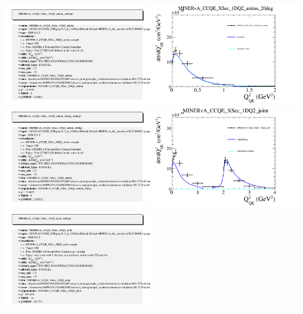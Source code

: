 \documentclass{article}
\begin{document}
\includegraphics[width=0.49\textwidth]{figures/nuisance_MINERvA_CCQE_XSec_1DQ2_antinu_info.png}
\centering
\includegraphics[width=0.49\textwidth]{figures/nuisance_MINERvA_CCQE_XSec_1DQ2_antinu_20deg_comp.png}
\includegraphics[width=0.49\textwidth]{figures/nuisance_MINERvA_CCQE_XSec_1DQ2_antinu_20deg_info.png}
\centering
\includegraphics[width=0.49\textwidth]{figures/nuisance_MINERvA_CCQE_XSec_1DQ2_joint_comp.png}
\includegraphics[width=0.49\textwidth]{figures/nuisance_MINERvA_CCQE_XSec_1DQ2_joint_info.png}
\end{document}
